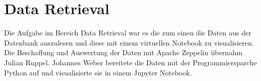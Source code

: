 \section{Data Retrieval}
Die Aufgabe im Bereich Data Retrieval war es die zum einen die Daten aus der Datenbank auszulesen und diese mit einem virtuellen Notebook zu visualisieren.
Die Beschaffung und Auswertung der Daten mit Apache Zeppelin übernahm Julian Ruppel.
Johannes Weber bereitete die Daten mit der Programmiersparche Python auf und visualisierte sie in einem Jupyter Notebook.


